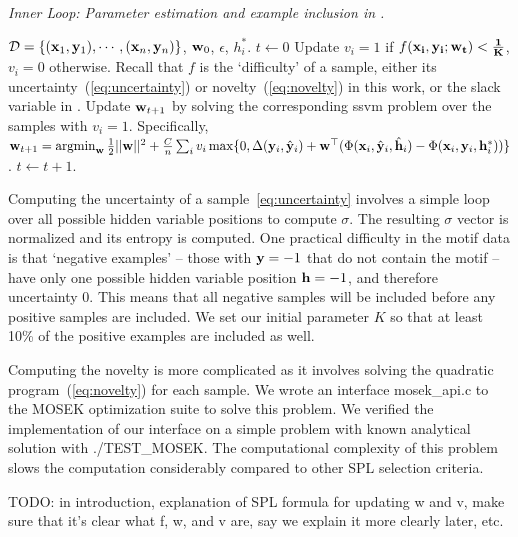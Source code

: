 \documentclass{article}
\newcommand{\mytopcaption}[1]{\caption{\em \footnotesize #1}}
\newcommand{\argmin}{\operatornamewithlimits{argmin}}
\begin{document}
\begin{algorithm}[h!]
\mytopcaption{Inner Loop: Parameter estimation and example inclusion in \sc{SPL}.}
\label{algo:latentSSVM}
\begin{algorithmic}[1]
\INPUT ${\cal D} = \{({\bf x}_1,{\bf y}_1),\cdots,({\bf x}_n,{\bf y}_n)\}$, ${\bf w}_0$, $\epsilon$, $h_i^*$.
\STATE $t \leftarrow 0$
\REPEAT
\STATE Update $v_i = 1$ if $f(\bf x_i, \bf y_i;\bf w_t) < \frac{1}{K}$, $v_i=0$ otherwise.  Recall that $f$ is the `difficulty' of a sample, either its uncertainty~(\ref{eq:uncertainty}) or novelty~(\ref{eq:novelty}) in this work, or the slack variable in \cite{SPL}.
\STATE Update ${\bf w}_{t+1}$ by solving the corresponding
{\sc ssvm} problem over the samples with $v_i=1$. Specifically, \\
${\bf w}_{t+1} = \argmin_{\bf w} \frac{1}{2}||{\bf w}||^2 + \frac{C}{n}\sum_{i} v_i\max\{0,\Delta({\bf y}_i,\hat{\bf y}_i) +
		{\bf w}^\top (\Phi({\bf x}_i,\hat{\bf y}_i,\hat{\bf h}_i) - \Phi({\bf x}_i,{\bf y}_i,{\bf h}_i^*))\}$.
\STATE $t \leftarrow t + 1$.
\end{algorithmic}
\end{algorithm}

Computing the uncertainty of a sample~\ref{eq:uncertainty} involves a simple loop over all possible hidden variable positions to compute $\sigma$.  The resulting $\sigma$ vector is normalized and its entropy is computed.  One practical difficulty in the motif data is that `negative examples' -- those with ${\bf y}=-1$ that do not contain the motif -- have only one possible hidden variable position ${\bf h}=-1$, and therefore uncertainty 0.  This means that all negative samples will be included before any positive samples are included.  We set our initial parameter $K$ so that at least 10\% of the positive examples are included as well.

Computing the novelty is more complicated as it involves solving the quadratic program~(\ref{eq:novelty}) for each sample.  We wrote an interface {\sc mosek\_api.c} to the MOSEK optimization suite \cite{Mosek} to solve this problem.  We verified the implementation of our interface on a simple problem with known analytical solution with {\sc ./TEST\_MOSEK}.  The computational complexity of this problem slows the computation considerably compared to other SPL selection criteria.

TODO: in introduction, explanation of SPL formula for updating w and v, make sure that it's clear what f, w, and v are, say we explain it more clearly later, etc.
\end{document}
